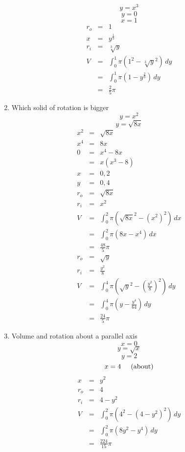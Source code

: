 \documentclass{article}
\begin{document}
\begin{enumerate}
        $$y = x^3$$
        $$y = 0$$
        $$x = 1$$
        \begin{eqnarray}
            r_o &=& 1 \\
            x &=& y^{\frac{1}{3}} \\
            r_i &=& \sqrt[3]{y} \\
            V &=& \int_0^1{\pi\left(1^2 - \sqrt[3]{y}^2\right)\,dy} \\
              &=& \int_0^1{\pi\left(1 - y^{\frac{2}{3}}\right)\,dy} \\
              &=& \frac{2}{5}\pi
        \end{eqnarray}
    \item Which solid of rotation is bigger
        $$y = x^2$$
        $$y = \sqrt{8x}$$
        \begin{eqnarray}
            x^2 &=& \sqrt{8x} \\
            x^4 &=& 8x \\
            0 &=& x^4 - 8x \\
              &=& x\left(x^3 - 8\right) \\
            x &=& 0, 2 \\
            y &=& 0, 4 \\
            r_o &=& \sqrt{8x} \\
            r_i &=& x^2 \\
            V &=& \int_0^2{\pi\left(\sqrt{8x}^2 - \left(x^2\right)^2\right)\,dx} \\
              &=& \int_0^2{\pi\left(8x - x^4\right)\,dx} \\
              &=& \frac{48}{5}\pi \\
            r_o &=& \sqrt{y} \\
            r_i &=& \frac{y^2}{8} \\
            V &=& \int_0^4{\pi\left(\sqrt{y}^2 - \left(\frac{y^2}{8}\right)^2\right)\,dy} \\
              &=& \int_0^4{\pi\left(y - \frac{y^4}{64}\right)\,dy} \\
              &=& \frac{24}{5}\pi
        \end{eqnarray}
    \item Volume and rotation about a parallel axis
        $$x = 0$$
        $$y = \sqrt{x}$$
        $$y = 2$$
        $$x = 4 \hspace{0.5cm} \text{(about)}$$
        \begin{eqnarray}
            x &=& y^2 \\
            r_o &=& 4 \\
            r_i &=& 4 - y^2 \\
            V &=& \int_0^2{\pi\left(4^2 - \left(4 - y^2\right)^2\right)\,dy} \\
              &=& \int_0^2{\pi\left(8y^2 - y^4\right)\,dy} \\
              &=& \frac{224}{15}\pi
        \end{eqnarray}
\end{enumerate}
\end{document}

